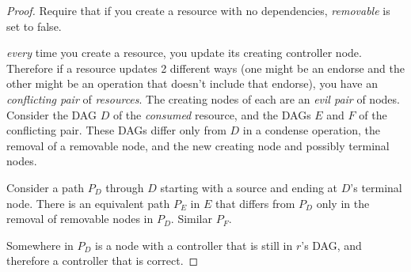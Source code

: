 \documentclass[a4paper,USenglish,cleveref, autoref, thm-restate, anonymous]{lipics-v2021}
\begin{document}
\begin{proof}



Require that if you create a resource with no dependencies, \emph{removable} is set to false.

\emph{every} time you create a resource, you update its creating controller node.
Therefore if a resource updates 2 different ways (one might be an endorse and the other might be an operation that doesn't include that endorse), you have an \emph{conflicting pair} of \emph{resources}.
The creating nodes of each are an \emph{evil pair} of nodes. 
Consider the DAG $D$ of the \emph{consumed} resource, and the DAGs $E$ and $F$ of the conflicting pair. 
These DAGs differ only from $D$ in a condense operation, the removal of a removable node, and the new creating node and possibly terminal nodes. 

Consider a path $P_D$ through $D$ starting with a source and ending at $D$'s terminal node. 
There is an equivalent path $P_E$ in $E$ that differs from $P_D$ only in the removal of removable nodes in $P_D$.
Similar $P_F$.

Somewhere in $P_D$ is a node with a controller that is still in $r$'s DAG, and therefore a controller that is correct.


\end{proof}
\end{document}
